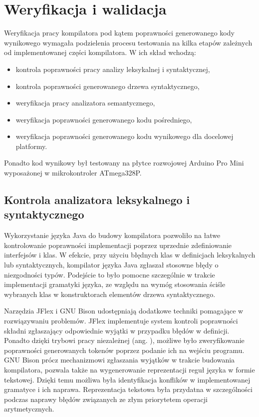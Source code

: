 \chapter{Weryfikacja i walidacja}
\label{ch:06}
Weryfikacja pracy kompilatora pod kątem poprawności generowanego kody wynikowego wymagała podzielenia procesu testowania na kilka etapów zależnych od implementowanej części kompilatora. W ich skład wchodzą:
\begin{itemize}
\item kontrola poprawności pracy analizy leksykalnej i syntaktycznej,
\item kontrola poprawności generowanego drzewa syntaktycznego,
\item weryfikacja pracy analizatora semantycznego,
\item weryfikacja poprawności generowanego kodu pośredniego,
\item weryfikacja poprawności generowanego kodu wynikowego dla docelowej platformy.
\end{itemize}
Ponadto kod wynikowy był testowany na płytce rozwojowej Arduino Pro Mini wyposażonej w mikrokontroler ATmega328P.
\section{Kontrola analizatora leksykalnego i syntaktycznego}
Wykorzystanie języka Java do budowy kompilatora pozwoliło na łatwe kontrolowanie poprawności implementacji poprzez uprzednie zdefiniowanie interfejsów i klas. W efekcie, przy użyciu błędnych klas w definicjach leksykalnych lub syntaktycznych, kompilator języka Java zgłaszał stosowne błędy o niezgodności typów. Podejście to było pomocne szczególnie w trakcie implementacji gramatyki języka, ze względu na wymóg stosowania ściśle wybranych klas w konstruktorach elementów drzewa syntaktycznego.

Narzędzia JFlex i GNU Bison udostępniają dodatkowe techniki pomagające w rozwiązywaniu problemów. JFlex implementuje system kontroli poprawności składni zgłaszający odpowiednie wyjątki w przypadku błędów w definicji. Ponadto dzięki trybowi pracy niezależnej (ang. ), możliwe było zweryfikowanie poprawności generowanych tokenów poprzez podanie ich na wejściu programu.
GNU Bison prócz mechanizmowi zgłaszania wyjątków w trakcie budowania kompilatora, pozwala także na wygenerowanie reprezentacji reguł języka w formie tekstowej. Dzięki temu możliwa była identyfikacja konflików w implementowanej gramatyce i ich naprawa. Reprezentacja tekstowa była przydatna w szczególności podczas naprawy błędów związanych ze złym priorytetem operacji arytmetycznych.

